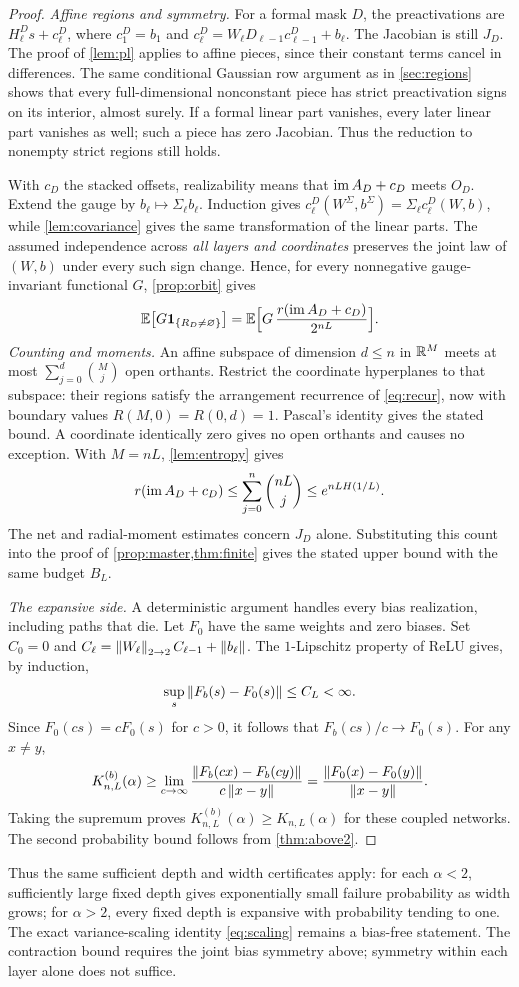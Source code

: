 \begin{proof}
\emph{Affine regions and symmetry.} For a formal mask $D$, the preactivations are $H^D_\ell s+c^D_\ell$, where $c^D_1=b_1$ and $c^D_\ell=W_\ell D_{\ell-1}c^D_{\ell-1}+b_\ell$. The Jacobian is still $J_D$. The proof of \cref{lem:pl} applies to affine pieces, since their constant terms cancel in differences. The same conditional Gaussian row argument as in \cref{sec:regions} shows that every full-dimensional nonconstant piece has strict preactivation signs on its interior, almost surely. If a formal linear part vanishes, every later linear part vanishes as well; such a piece has zero Jacobian. Thus the reduction to nonempty strict regions still holds.

With $c_D$ the stacked offsets, realizability means that $\operatorname{im} A_D+c_D$ meets $O_D$. Extend the gauge by $b_\ell\mapsto\Sigma_\ell b_\ell$. Induction gives $c^D_\ell(W^\Sigma,b^\Sigma)=\Sigma_\ell c^D_\ell(W,b)$, while \cref{lem:covariance} gives the same transformation of the linear parts. The assumed independence across \emph{all layers and coordinates} preserves the joint law of $(W,b)$ under every such sign change. Hence, for every nonnegative gauge-invariant functional $G$, \cref{prop:orbit} gives
\[
\mathbb{E}\bigl[G\mathbf{1}_{\{R_D\ne\varnothing\}}\bigr]=\mathbb{E}\Bigl[G\,\frac{r(\operatorname{im} A_D+c_D)}{2^{nL}}\Bigr].
\]
\emph{Counting and moments.} An affine subspace of dimension $d\le n$ in $\mathbb{R}^M$ meets at most $\sum_{j=0}^d\binom Mj$ open orthants. Restrict the coordinate hyperplanes to that subspace: their regions satisfy the arrangement recurrence of \cref{eq:recur}, now with boundary values $R(M,0)=R(0,d)=1$. Pascal's identity gives the stated bound. A coordinate identically zero gives no open orthants and causes no exception. With $M=nL$, \cref{lem:entropy} gives
\[
r(\operatorname{im} A_D+c_D)\le\sum_{j=0}^n\binom{nL}j\le e^{nLH(1/L)}.
\]
The net and radial-moment estimates concern $J_D$ alone. Substituting this count into the proof of \cref{prop:master,thm:finite} gives the stated upper bound with the same budget $B_L$.

\emph{The expansive side.} A deterministic argument handles every bias realization, including paths that die. Let $F_0$ have the same weights and zero biases. Set $C_0=0$ and $C_\ell=\left\lVert W_\ell\right\rVert_{2\to 2}C_{\ell-1}+\left\lVert b_\ell\right\rVert$. The $1$-Lipschitz property of ReLU gives, by induction,
\[
\sup_s\left\lVert F_b(s)-F_0(s)\right\rVert\le C_L<\infty.
\]
Since $F_0(cs)=cF_0(s)$ for $c>0$, it follows that $F_b(cs)/c\to F_0(s)$. For any $x\ne y$,
\[
K^{(b)}_{n,L}(\alpha)\ge\lim_{c\to\infty}
\frac{\left\lVert F_b(cx)-F_b(cy)\right\rVert}{c\left\lVert x-y\right\rVert}
=\frac{\left\lVert F_0(x)-F_0(y)\right\rVert}{\left\lVert x-y\right\rVert}.
\]
Taking the supremum proves $K^{(b)}_{n,L}(\alpha)\ge K_{n,L}(\alpha)$ for these coupled networks. The second probability bound follows from \cref{thm:above2}.
\end{proof}

Thus the same sufficient depth and width certificates apply: for each $\alpha<2$, sufficiently large fixed depth gives exponentially small failure probability as width grows; for $\alpha>2$, every fixed depth is expansive with probability tending to one. The exact variance-scaling identity \cref{eq:scaling} remains a bias-free statement. The contraction bound requires the joint bias symmetry above; symmetry within each layer alone does not suffice.
